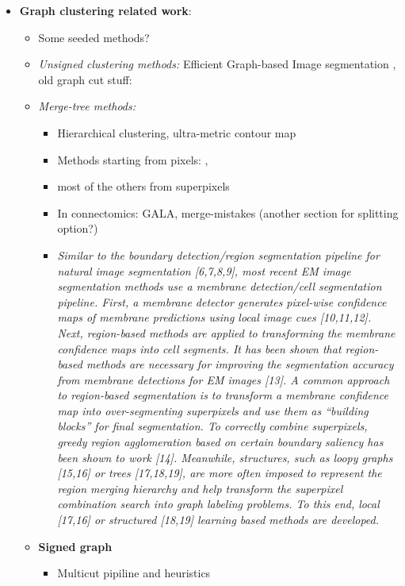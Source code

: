 \begin{itemize}
\item \textbf{Graph clustering related work}:
\begin{itemize}
\item Some seeded methods?
\item \textit{Unsigned clustering methods:} Efficient Graph-based Image segmentation \cite{felzenszwalb2004efficient}, old graph cut stuff: \cite{shi2000normalized}  
\item \textit{Merge-tree methods:} 
\begin{itemize}
\item Hierarchical clustering, ultra-metric contour map 
\item Methods starting from pixels: \cite{liu2018affinity}, %
\item most of the others from superpixels
\item In connectomics: GALA, merge-mistakes (another section for splitting option?)
\item \textit{Similar to the boundary detection/region segmentation pipeline for natural image segmentation [6,7,8,9], most recent EM image segmentation methods use a membrane detection/cell segmentation pipeline. First, a membrane detector generates pixel-wise conﬁdence maps of membrane predictions using local image cues [10,11,12]. Next, region-based methods are applied to transforming the membrane conﬁdence maps into cell segments. It has been shown that region-based methods are necessary for improving the segmentation accuracy from membrane detections for EM images [13]. A common approach to region-based segmentation is to transform a membrane conﬁdence map into over-segmenting superpixels and use them as “building blocks” for ﬁnal segmentation. To correctly combine superpixels, greedy region agglomeration based on certain boundary saliency has been shown to work [14]. Meanwhile, structures, such as loopy graphs [15,16] or trees [17,18,19], are more often imposed to represent the region merging hierarchy and help transform the superpixel combination search into graph labeling problems. To this end, local [17,16] or structured [18,19] learning based methods are developed.}  
\end{itemize}
\item \textbf{Signed graph}
\begin{itemize}
\item Multicut pipiline and heuristics


\end{itemize}
\end{itemize}
\end{itemize}

